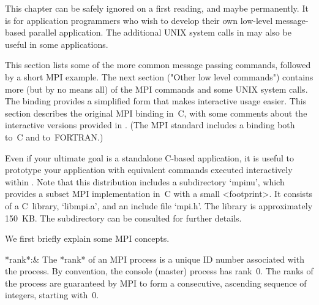 

This chapter can  be  safely  ignored  on  a  first  reading,  and  maybe
permanently. It is for application programmers who wish to develop  their
own low-level message-based parallel  application.  The  additional  UNIX
system calls in {\ParGAP} may also be useful in some applications.


This section lists some of the  more  common  message  passing  commands,
followed by a short MPI example.  The  next  section  ("Other  low  level
commands") contains more (but by no means all) of the  MPI  commands  and
some UNIX system calls. The {\ParGAP} binding provides a simplified  form
that makes interactive usage easier. This section describes the  original
MPI binding in~C, with  some  comments  about  the  interactive  versions
provided in {\ParGAP}. (The MPI standard includes a binding both to~C and
to~FORTRAN.)

Even if your ultimate goal is a standalone  C-based  application,  it  is
useful to prototype your application with  equivalent  commands  executed
interactively within {\ParGAP}. Note that this  distribution  includes  a
subdirectory `mpinu', which provides a  subset  MPI  implementation  in~C
with a small <footprint>. It consists of a C~library, `libmpi.a', and  an
include  file  `mpi.h'.  The  library  is   approximately   150~KB.   The
subdirectory can be consulted for further details.

We first briefly explain some MPI concepts.

\beginitems

*rank*:& 
    The *rank* of an MPI process is a unique ID  number  associated  with
    the process. By convention, the console (master) process has  rank~0.
    The ranks of the process are guaranteed by MPI to form a consecutive,
    ascending sequence of integers, starting with~0.

